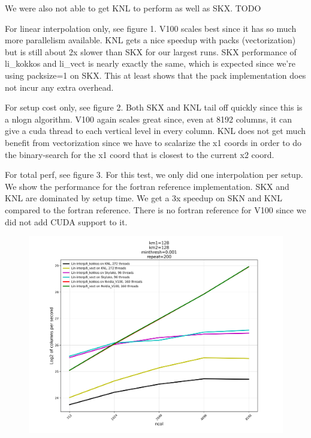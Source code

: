 \documentclass[10pt,twocolumn]{article}
\begin{document}
We were also not able to get KNL to perform as well as SKX. TODO

For linear interpolation only, see figure 1. V100 scales best since it has so much more parallelism
available. KNL gets a nice speedup with packs (vectorization) but is still about 2x slower than SKX
for our largest runs. SKX performance of li\_kokkos and li\_vect is nearly exactly the same, which is
expected since we're using packsize=1 on SKX. This at least shows that the pack implementation does not incur
any extra overhead.

For setup cost only, see figure 2. Both SKX and KNL tail off quickly since this is a nlogn algorithm. V100
again scales great since, even at 8192 columns, it can give a cuda thread to each vertical level in every
column. KNL does not get much benefit from vectorization since we have to scalarize the x1 coords in order
to do the binary-search for the x1 coord that is closest to the current x2 coord.

For total perf, see figure 3. For this test, we only did one interpolation per setup. We show
the performance for the fortran reference implementation. SKX and KNL are dominated by setup
time. We get a 3x speedup on SKN and KNL compared to the fortran reference. There is no fortran
reference for V100 since we did not add CUDA support to it.

\onecolumn

\begin{figure}[hbt]
  \centering
  \includegraphics[width=1.0\linewidth]{final-li.pdf}
\end{figure}
\end{document}
